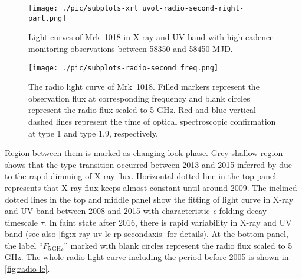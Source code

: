 \begin{comment}
picurl=https://github.com/brettlv/brettlv.github.io/pythoncode/Mrk1018/pic
This is a simple template for authors to write new MNRAS papers.
See \texttt{mnras\_sample.tex} for a more complex example, and \texttt{mnras\_guide.tex}
for a full user guide.
All papers should start with an Introduction section, which sets the work
in context, cites relevant earlier studies in the field by \citet{Others2013},
and describes the problem the authors aim to solve \citep[e.g.][]{Author2012}.
\end{comment}
\begin{comment}
Normally the next section describes the techniques the authors used.
It is frequently split into subsections, such as Section~\ref{sec:maths} below.
\end{comment}


\begin{figure*}
\centering
	\texttt{[image: ./pic/subplots-xrt\_uvot-radio-second-right-part.png]}
    \caption{Light curves of Mrk~1018 in X-ray and UV band with high-cadence monitoring observations between 58350 and 58450 MJD.}
    \label{fig:x-ray-uv-lc-rp-secondaxis}
\end{figure*}

\begin{figure*}
\centering
	\texttt{[image: ./pic/subplots-radio-second\_freq.png]}
    \caption{The radio light curve of Mrk~1018. Filled markers represent the observation flux at corresponding frequency and blank circles represent the radio flux scaled to 5 GHz. Red and blue vertical dashed lines represent the time of optical spectroscopic confirmation at type 1 and type 1.9, respectively.}
    \label{fig:radio-lc}
\end{figure*}



Region between them is marked as changing-look phase. Grey shallow region shows that the type transition occurred between 2013 and 2015 inferred by \citet{2017A&A...607L...9K} due to the rapid dimming of X-ray flux. Horizontal dotted line in the top panel represents that X-ray flux keeps almost constant until around 2009. The inclined dotted lines in the top and middle panel show the fitting of light curve in X-ray and UV band between 2008 and 2015 with characteristic \textit{e}-folding decay timescale $\tau$. In faint state after 2016, there is rapid variability in X-ray and UV band (see also \autoref{fig:x-ray-uv-lc-rp-secondaxis} for details). At the bottom panel, the label ``$F_\mathrm{5\,GHz}$'' marked with blank circles represent the radio flux scaled to 5 GHz. The whole radio light curve including the period before 2005 is shown in \autoref{fig:radio-lc}.





